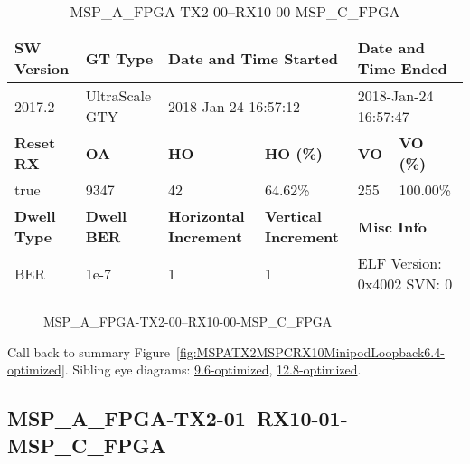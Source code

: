 \begin{table}[h]
\centering
\caption{MSP\_A\_FPGA-TX2-00--RX10-00-MSP\_C\_FPGA}
\label{tab:MSPAFPGATX200RX1000MSPCFPGA6.4-optimized}
\begin{tabular}{@{}|l|l|l|l|l|l|@{}}
\toprule
\textbf{SW Version}                & \textbf{GT Type}   & \multicolumn{2}{l|}{\textbf{Date and Time Started}}            & \multicolumn{2}{l|}{\textbf{Date and Time Ended}}        \\ \midrule
2017.2                       & UltraScale GTY          & \multicolumn{2}{l|}{2018-Jan-24 16:57:12}                   & \multicolumn{2}{l|}{2018-Jan-24 16:57:47}               \\ \midrule
\textbf{Reset RX}                  & \textbf{OA} & \textbf{HO}   & \textbf{HO (\%)} & \textbf{VO} & \textbf{VO (\%)} \\ \midrule
true & 9347        & 42          & 64.62\%        & 255        & 100.00\%       \\ \midrule
\textbf{Dwell Type}                & \textbf{Dwell BER} & \textbf{Horizontal Increment} & \textbf{Vertical Increment}    & \multicolumn{2}{l|}{\textbf{Misc Info}}                  \\ \midrule
BER                            & 1e-7        & 1        & 1           & \multicolumn{2}{l|}{ELF Version: 0x4002 SVN: 0}                         \\ \bottomrule
\end{tabular}
\end{table}

\begin{figure}[h]
\caption{MSP\_A\_FPGA-TX2-00--RX10-00-MSP\_C\_FPGA} \label{fig:MSPAFPGATX200RX1000MSPCFPGA6.4-optimized}
\end{figure}

Call back to summary Figure~\ref{fig:MSPATX2MSPCRX10MinipodLoopback6.4-optimized}.
Sibling eye diagrams: \hyperref[sec:MSPAFPGATX200RX1000MSPCFPGA9.6-optimized]{9.6-optimized}, \hyperref[sec:MSPAFPGATX200RX1000MSPCFPGA12.8-optimized]{12.8-optimized}.

\clearpage
\newpage


\subsection{MSP\_A\_FPGA-TX2-01--RX10-01-MSP\_C\_FPGA}\label{sec:MSPAFPGATX201RX1001MSPCFPGA6.4-optimized}

